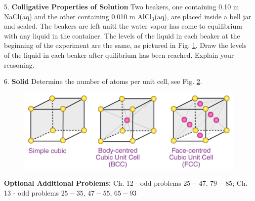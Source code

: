 \documentclass[11pt]{article}
\begin{document}
5. \textbf{Colligative Properties of Solution} Two beakers, one containing 0.10 m NaCl(aq)
and the other containing 0.010 m AlCl$_3$(aq), are placed inside a bell jar and sealed.
The beakers are left unitl the water vapor has come to equilibrium with any liquid in the
container. The levels of the liquid in each beaker at the beginning of the experiment
are the same, as pictured in Fig. \ref{fig:beakers}. Draw the levels of the liquid in
each beaker after quilibrium has been reached. Explain your reasoning.

\begin{figure}[hbpt]
  \centering
  \label{fig:beakers}
\end{figure}

6. \textbf{Solid} Determine the number of atoms per unit cell, see Fig. \ref{fig:cubic}.

\begin{figure}[hbpt]
  \centering
  \includegraphics[scale=0.3]{cubic.png}
  \label{fig:cubic}
\end{figure}

\vfill
\textbf{Optional Additional Problems:} Ch. 12 - odd problems $25 - 47$, $79 - 85$;
Ch. 13 - odd problems $25 - 35$, $47 - 55$, $65 - 93$
\end{document}

